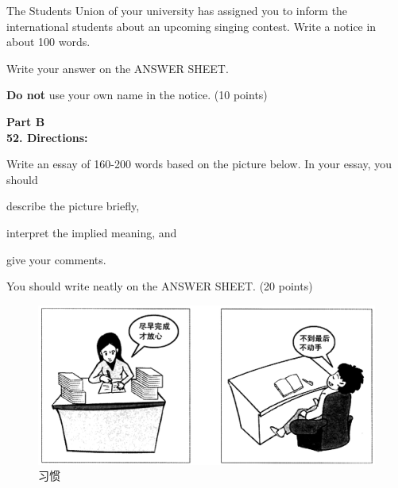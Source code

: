 The Students Union of your university has assigned you to inform the
international students about an upcoming singing contest. Write a notice
in about 100 words.

Write your answer on the ANSWER SHEET.

\textbf{Do not} use your own name in the notice. (10 points)


\vspace{2em}

\noindent
\textbf{Part B}\\
\textbf{52. Directions:}



Write an essay of 160-200 words based on the picture below. In your
essay, you should

\begin{listwrite}
	\item 
	 describe the picture briefly,
	
	\item 
	 interpret the implied meaning, and
	
	\item 
	 give your comments.
\end{listwrite}


You should write neatly on the ANSWER SHEET. (20 points)


\begin{figure}[h!]
	\centering
	\includegraphics[width=0.76\linewidth]{picture/2020.png}
	\caption*{习惯}
\end{figure}




